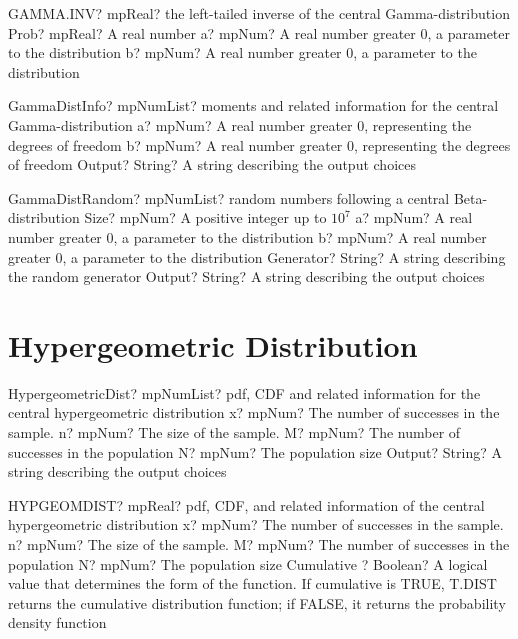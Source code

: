 \documentclass[12pt,a4paper,openany]{book}
\begin{document}
\begin{mpFunctionsExtract}
\mpWorksheetFunctionThreeNotImplemented
{GAMMA.INV? mpReal? the left-tailed inverse of the central Gamma-distribution}
{Prob? mpReal? A real number}
{a? mpNum? A real number greater 0, a parameter to the distribution}
{b? mpNum? A real number greater 0, a parameter to the distribution}
\end{mpFunctionsExtract}

\begin{mpFunctionsExtract}
\mpFunctionTwoNotImplemented
{GammaDistInfo? mpNumList? moments and related information for the central Gamma-distribution}
{a? mpNum? A real number greater 0, representing the degrees of freedom}
{b? mpNum? A real number greater 0, representing the degrees of freedom}
{Output? String? A string describing the output choices}
\end{mpFunctionsExtract}

\begin{mpFunctionsExtract}
\mpFunctionFiveNotImplemented
{GammaDistRandom? mpNumList? random numbers following a central Beta-distribution}
{Size? mpNum? A positive integer up to $10^7$}
{a? mpNum? A real number greater 0, a parameter to the distribution}
{b? mpNum? A real number greater 0, a parameter to the distribution}
{Generator? String? A string describing the random generator}
{Output? String? A string describing the output choices}
\end{mpFunctionsExtract}

\section{Hypergeometric Distribution}

\begin{mpFunctionsExtract}
\mpFunctionFiveNotImplemented
{HypergeometricDist? mpNumList? pdf, CDF and related information for the central hypergeometric distribution}
{x? mpNum? The number of successes in the sample.}
{n? mpNum? The size of the sample.}
{M? mpNum? The number of successes in the population}
{N? mpNum? The population size}
{Output? String? A string describing the output choices}
\end{mpFunctionsExtract}

\begin{mpFunctionsExtract}
\mpWorksheetFunctionFiveNotImplemented
{HYPGEOMDIST? mpReal? pdf, CDF, and related information of the central hypergeometric distribution}
{x? mpNum? The number of successes in the sample.}
{n? mpNum? The size of the sample.}
{M? mpNum? The number of successes in the population}
{N? mpNum? The population size}
{Cumulative ? Boolean? A logical value that determines the form of the function. If cumulative is TRUE, T.DIST returns the cumulative distribution function; if FALSE, it returns the probability density function}
\end{mpFunctionsExtract}
\end{document}
